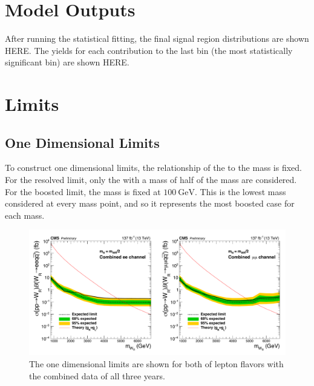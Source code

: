 \section{Model Outputs}
After running the statistical fitting, the final signal region distributions are shown HERE. The yields for each contribution to the last bin (the most statistically significant bin) are shown HERE.
\section{Limits}

\subsection{One Dimensional Limits}
To construct one dimensional limits, the relationship of the \NR to the \WR mass is fixed. For the resolved limit, only the \NR with a mass of half of the \WR mass are considered. For the boosted limit, the \NR mass is fixed at \ensuremath{\SI{100}{\GeV}}. This is the lowest mass \NR considered at every \WR mass point, and so it represents the most boosted \WR case for each \WR mass.

\begin{figure}[!tp]
    \centering
    \includegraphics[width=\textwidth]{figures/Results/1D_limit_allYear_unblinded.pdf}
    \caption[
       1 Dimensional Limits.
    ]{
        The one dimensional limits are shown for both of lepton flavors with the combined data of all three years.  
    }
    \label{fig:1Dlimit}
\end{figure}

